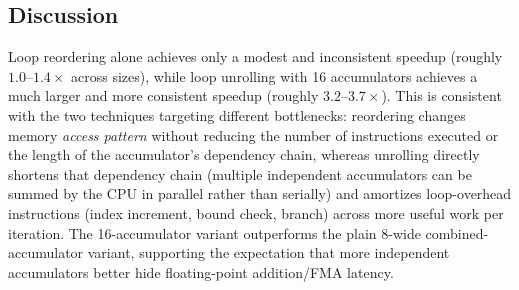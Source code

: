 \documentclass[11pt]{article}
\begin{document}
\begin{table}[H]
  \centering
  \caption{8-wide Unroll}
  \label{tab:unroll_unrolling8combo}
\end{table}

\subsection{Discussion}
Loop reordering alone achieves only a modest and inconsistent speedup (roughly
$1.0$--$1.4\times$ across sizes), while loop unrolling with 16 accumulators achieves a
much larger and more consistent speedup (roughly $3.2$--$3.7\times$). This is consistent
with the two techniques targeting different bottlenecks: reordering changes memory
\emph{access pattern} without reducing the number of instructions executed or the length
of the accumulator's dependency chain, whereas unrolling directly shortens that
dependency chain (multiple independent accumulators can be summed by the CPU in
parallel rather than serially) and amortizes loop-overhead instructions (index increment,
bound check, branch) across more useful work per iteration. The 16-accumulator variant
outperforms the plain 8-wide combined-accumulator variant, supporting the expectation that
more independent accumulators better hide floating-point addition/FMA latency.
\end{document}
